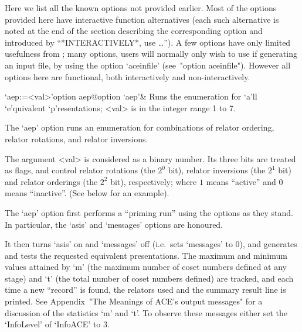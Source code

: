 

Here we list all the known {\ACE} options not provided  earlier.  Most
of the options provided here have  interactive  function  alternatives
(each such alternative is noted at the end of the  section  describing
the corresponding option  and  introduced  by  ``*INTERACTIVELY*,  use
\dots''). A few options have only limited usefulness from {\GAP}; many
options, users will normally only wish to use if generating  an  input
file,  by  using  the  option  `aceinfile'  (see~"option  aceinfile").
However all  options  here  are  functional,  both  interactively  and
non-interactively.


\beginitems

\>`aep:=<val>'{option aep}@{option `aep'}&
Runs the enumeration for `a'll `e'quivalent `p'resentations;
<val> is in the integer range 1 to 7.

The `aep' option runs  an  enumeration  for  combinations  of  relator
ordering, relator rotations, and relator inversions.

The argument <val> is considered as a binary number.  Its  three  bits
are treated as flags, and control relator rotations (the  $2^0$  bit),
relator inversions (the $2^1$ bit) and relator  orderings  (the  $2^2$
bit),  respectively;  where  $1$  means  ``active''  and   $0$   means
``inactive''. (See below for an example).

The `aep' option first performs a ``priming run'' using the options as
they stand. In particular,  the  `asis'  and  `messages'  options  are
honoured.

It then turns `asis' on and `messages' off  (i.e.~sets  `messages'  to
0), and generates and tests the  requested  equivalent  presentations.
The maximum and minimum values attained by `m' (the maximum number  of
coset numbers defined at any stage) and `t' (the total number of coset
numbers defined) are tracked, and each time a new ``record'' is found,
the relators  used  and  the  summary  result  line  is  printed.  See
Appendix~"The Meanings of ACE's output messages" for a  discussion  of
the statistics `m' and `t'. To observe these messages either  set  the
`InfoLevel' of `InfoACE' to 3.

